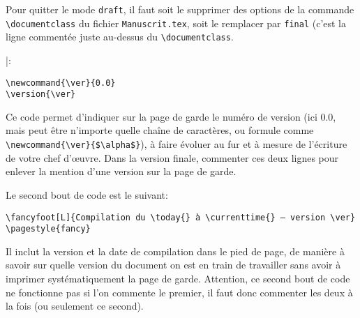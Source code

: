 Pour quitter le mode \verb|draft|, il faut soit le supprimer des options de la commande \verb|\documentclass| du fichier \verb|Manuscrit.tex|, soit le remplacer par \verb|final| (c'est la ligne commentée juste au-dessus du \verb|\documentclass|.
\begin{document}
|:

\begin{verbatim}
\newcommand{\ver}{0.0}
\version{\ver}
\end{verbatim}

Ce code permet d'indiquer sur la page de garde le numéro de version (ici 0.0, mais peut être n'importe quelle chaîne de caractères, ou formule comme \verb|\newcommand{\ver}{$\alpha$}|), à faire évoluer au fur et à mesure de l'écriture de votre chef d'œuvre. Dans la version finale, commenter ces deux lignes pour enlever la mention d'une version sur la page de garde.

Le second bout de code est le suivant:

\begin{verbatim}
\fancyfoot[L]{Compilation du \today{} à \currenttime{} – version \ver}
\pagestyle{fancy}
\end{verbatim}

Il inclut la version et la date de compilation dans le pied de page, de manière à savoir sur quelle version du document on est en train de travailler sans avoir à imprimer systématiquement la page de garde.
Attention, ce second bout de code ne fonctionne pas si l'on commente le premier, il faut donc commenter les deux à la fois (ou seulement ce second).
\end{document}
